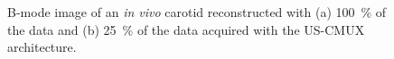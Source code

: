 \documentclass[9pt,conference]{IEEEtran}
\begin{document}
\begin{figure}[htb]
	\hfill%
	\hfill%
	\hfill%
	\caption{B-mode image of an \textit{in vivo} carotid reconstructed with (a) \SI{100}{\percent} of the data and (b) \SI{25}{\percent} of the data acquired with the US-CMUX architecture.}
	\label{fig:carotid}
\end{figure} 
\end{document}
